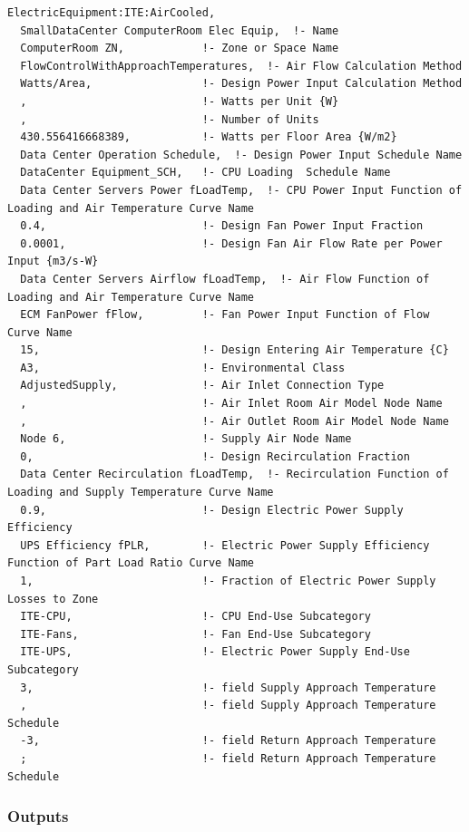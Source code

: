 \begin{lstlisting}
ElectricEquipment:ITE:AirCooled,
  SmallDataCenter ComputerRoom Elec Equip,  !- Name
  ComputerRoom ZN,            !- Zone or Space Name
  FlowControlWithApproachTemperatures,  !- Air Flow Calculation Method
  Watts/Area,                 !- Design Power Input Calculation Method
  ,                           !- Watts per Unit {W}
  ,                           !- Number of Units
  430.556416668389,           !- Watts per Floor Area {W/m2}
  Data Center Operation Schedule,  !- Design Power Input Schedule Name
  DataCenter Equipment_SCH,   !- CPU Loading  Schedule Name
  Data Center Servers Power fLoadTemp,  !- CPU Power Input Function of Loading and Air Temperature Curve Name
  0.4,                        !- Design Fan Power Input Fraction
  0.0001,                     !- Design Fan Air Flow Rate per Power Input {m3/s-W}
  Data Center Servers Airflow fLoadTemp,  !- Air Flow Function of Loading and Air Temperature Curve Name
  ECM FanPower fFlow,         !- Fan Power Input Function of Flow Curve Name
  15,                         !- Design Entering Air Temperature {C}
  A3,                         !- Environmental Class
  AdjustedSupply,             !- Air Inlet Connection Type
  ,                           !- Air Inlet Room Air Model Node Name
  ,                           !- Air Outlet Room Air Model Node Name
  Node 6,                     !- Supply Air Node Name
  0,                          !- Design Recirculation Fraction
  Data Center Recirculation fLoadTemp,  !- Recirculation Function of Loading and Supply Temperature Curve Name
  0.9,                        !- Design Electric Power Supply Efficiency
  UPS Efficiency fPLR,        !- Electric Power Supply Efficiency Function of Part Load Ratio Curve Name
  1,                          !- Fraction of Electric Power Supply Losses to Zone
  ITE-CPU,                    !- CPU End-Use Subcategory
  ITE-Fans,                   !- Fan End-Use Subcategory
  ITE-UPS,                    !- Electric Power Supply End-Use Subcategory
  3,                          !- field Supply Approach Temperature
  ,                           !- field Supply Approach Temperature Schedule
  -3,                         !- field Return Approach Temperature
  ;                           !- field Return Approach Temperature Schedule
\end{lstlisting}

\subsubsection{Outputs}

